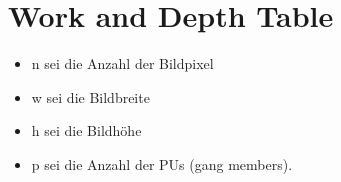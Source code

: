 \documentclass{article}
\begin{document}
    \newpage
    
    \section{Work and Depth Table}
      
      \begin{itemize}
        \item n sei die Anzahl der Bildpixel
        \item w sei die Bildbreite
        \item h sei die Bildhöhe
        \item p sei die Anzahl der PUs (gang members).
      \end{itemize}
      
      \paragraph{}
\end{document}
